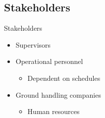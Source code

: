 \subsection{Stakeholders}
\begin{frame}{Stakeholders}{}
\begin{itemize}
	\item Supervisors
	\item Operational personnel
	\begin{itemize}
		\item Dependent on schedules
	\end{itemize}
	\item Ground handling companies
	\begin{itemize}
		\item Human resources
	\end{itemize}
\end{itemize}
\end{frame}